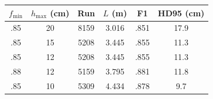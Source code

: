 \begin{tabular}{@{}cccccc@{}}
\toprule
$f_{\min}$ & $h_{\max}$ (cm) & Run & $L$ (m) & F1 & HD95 (cm) \\
\midrule
.85 & 20 & 8159 & 3.016 & .851 & 17.9 \\
.85 & 15 & 5208 & 3.445 & .855 & 11.3 \\
.85 & 12 & 5208 & 3.445 & .855 & 11.3 \\
.88 & 12 & 5159 & 3.795 & .881 & 11.8 \\
.85 & 10 & 5309 & 4.434 & .878 & 9.7 \\
\bottomrule
\end{tabular}
